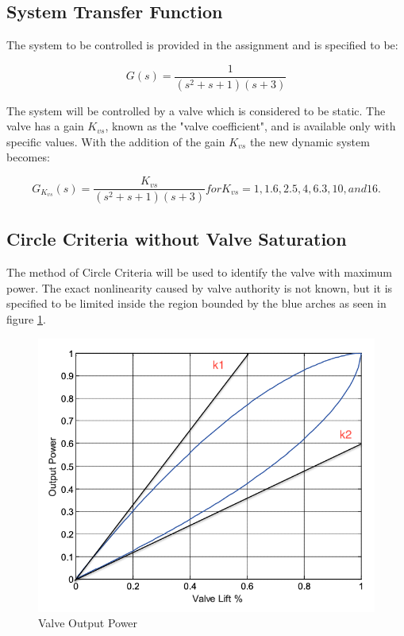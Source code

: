 \documentclass[a4paper, titlepage]{article}
\begin{document}
\subsection{System Transfer Function}
The system to be controlled is provided in the assignment and is specified to be:

\begin{equation}
	G(s) = \frac{1}{(s^2+s+1)(s+3)}
	\label{equ:system}
\end{equation}

The system will be controlled by a valve which is considered to be static.  The valve has a gain $K_{vs}$, known as the "valve coefficient", and is available only with specific values.
With the addition of the gain $K_{vs}$ the new dynamic system becomes:

\begin{equation}
	G_{K_{vs}}(s) = \frac{K_{vs}}{(s^2+s+1)(s+3)} for K_{vs}=1, 1.6, 2.5, 4, 6.3, 10, and 16.
	\label{equ:systemTF}
\end{equation}


\subsection{Circle Criteria without Valve Saturation}

The method of Circle Criteria will be used to identify the valve with maximum power.  The exact nonlinearity caused by valve authority is not known, but it is specified to be limited inside the region bounded by the blue arches as seen in figure \ref{fig:valvepower}.

\begin{figure}[h!]
\center
\includegraphics[scale=0.25]{../figures/valveOutputPower.png}
\caption{Valve Output Power}
\label{fig:valvepower}
\end{figure}
\end{document}
